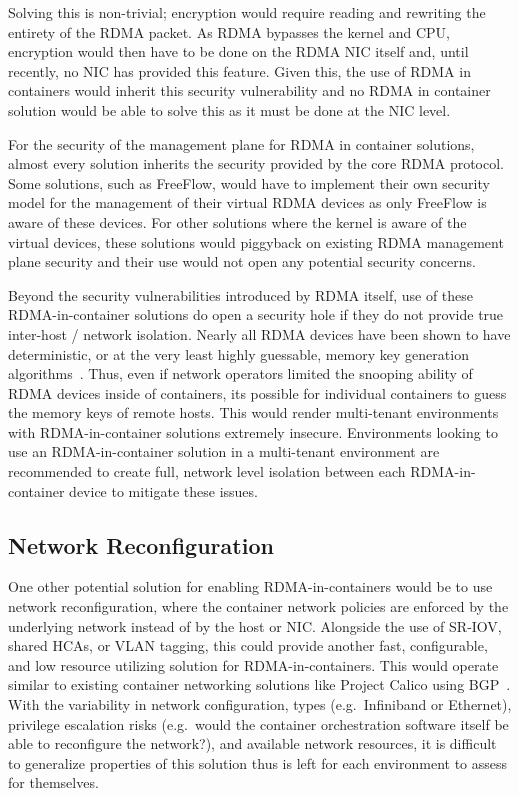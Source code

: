 \documentclass[12pt,titlepage]{article}
\begin{document}
Solving this is non-trivial; encryption would require reading and rewriting the entirety of the RDMA packet. 
As RDMA bypasses the kernel and CPU, encryption would then have to be done on the RDMA NIC itself and, until recently, no NIC has provided this feature.
Given this, the use of RDMA in containers would inherit this security vulnerability and no RDMA in container solution would be able to solve this as it must be done at the NIC level.

For the security of the management plane for RDMA in container solutions, almost every solution inherits the security provided by the core RDMA protocol.
Some solutions, such as FreeFlow, would have to implement their own security model for the management of their virtual RDMA devices as only FreeFlow is aware of these devices.
For other solutions where the kernel is aware of the virtual devices, these solutions would piggyback on existing RDMA management plane security and their use would not open any potential security concerns.

Beyond the security vulnerabilities introduced by RDMA itself, use of these RDMA-in-container solutions do open a security hole if they do not provide true inter-host / network isolation.
Nearly all RDMA devices have been shown to have deterministic, or at the very least highly guessable, memory key generation algorithms~\cite{redmark}.
Thus, even if network operators limited the snooping ability of RDMA devices inside of containers, its possible for individual containers to guess the memory keys of remote hosts.
This would render multi-tenant environments with RDMA-in-container solutions extremely insecure.
Environments looking to use an RDMA-in-container solution in a multi-tenant environment are recommended to create full, network level isolation between each RDMA-in-container device to mitigate these issues.

\subsection{Network Reconfiguration}
One other potential solution for enabling RDMA-in-containers would be to use network reconfiguration, where the container network policies are enforced by the underlying network instead of by the host or NIC\@.
Alongside the use of SR-IOV, shared HCAs, or VLAN tagging, this could provide another fast, configurable, and low resource utilizing solution for RDMA-in-containers.
This would operate similar to existing container networking solutions like Project Calico using BGP~\cite{caliconetwork}.
With the variability in network configuration, types (e.g.\ Infiniband or Ethernet), privilege escalation risks (e.g.\ would the container orchestration software itself be able to reconfigure the network?), and available network resources, it is difficult to generalize properties of this solution thus is left for each environment to assess for themselves.
\end{document}
